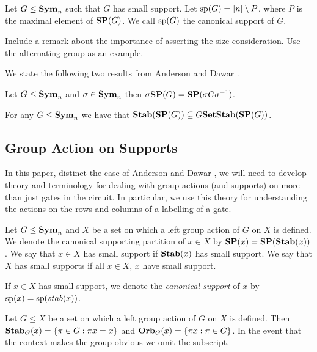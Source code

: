\documentclass[../paper.tex]{subfiles}
\begin{document}
\begin{definition}
  Let $G \leq \text{\textbf{Sym}}_n$ such that $G$ has small support. Let
  $\text{sp}(G) = [n] \setminus P$, where $P$ is the maximal element of $\text{\textbf{SP}}(G)$.
  We call $\text{sp}(G)$ the canonical support of $G$.
\end{definition}

\begin{remark}
  Include a remark about the importance of asserting the size consideration. Use
  the alternating group as an example.
\end{remark}

We state the following two results from Anderson and Dawar \cite{AndersonD17}.

\begin{lem}
  \label{lem:SP_conjugation}
  Let $G \leq \text{\textbf{Sym}}_n$ and $\sigma \in \text{\textbf{Sym}}_n$ then $\sigma \text{\textbf{SP}} (G) = \text{\textbf{SP}}(\sigma
  G \sigma^{-1})$.
\end{lem}

\begin{lem}
  For any $G \leq \text{\textbf{Sym}}_n$ we have that $\text{\textbf{Stab}} (\text{\textbf{SP}} (G)) \subseteq G
  \text{\textbf{SetStab}}(\text{\textbf{SP}}(G))$.
\end{lem}

\subsection{Group Action on Supports}
In this paper, distinct the case of Anderson and Dawar \cite{AndersonD17}, we
will need to develop theory and terminology for dealing with group actions (and
supports) on more than just gates in the circuit. In particular, we use this
theory for understanding the actions on the rows and columns of a labelling of a
gate.

\begin{definition}
  Let $G \leq \text{\textbf{Sym}}_n$ and $X$ be a set on which a left group
  action of $G$ on $X$ is defined. We denote the canonical supporting partition
  of $x\in X$ by $\text{\textbf{SP}} (x) = \text{\textbf{SP}} (\text{\textbf{Stab}}(x))$. We say that $x \in X$ has small
  support if $\text{\textbf{Stab}}(x)$ has small support. We say that $X$ has small supports if
  all $x \in X$, $x$ have small support.

  If $x \in X$ has small support, we denote the \emph{canonical support} of $x$
  by $\text{sp}(x) = \text{sp} (stab(x))$.
\end{definition}

\begin{definition}
  Let $G \leq X$ be a set on which a left group action of $G$ on $X$
  is defined. Then $\text{\textbf{Stab}}_G (x) = \{\pi \in G : \pi x = x\}$ and $\text{\textbf{Orb}}_G (x) =
  \{\pi x : \pi \in G\}$. In the event that the context makes the group obvious
  we omit the subscript.
\end{definition}
\end{document}
